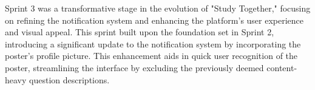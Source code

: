 




Sprint 3 was a transformative stage in the evolution of "Study Together," focusing on refining the notification system and enhancing the platform's user experience and visual appeal. This sprint built upon the foundation set in Sprint 2, introducing a significant update to the notification system by incorporating the poster's profile picture. This enhancement aids in quick user recognition of the poster, streamlining the interface by excluding the previously deemed content-heavy question descriptions.

